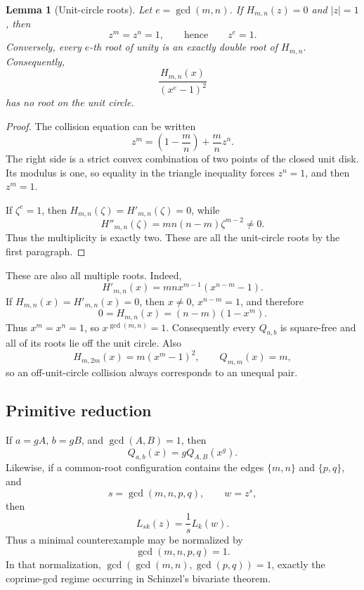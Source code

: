 \documentclass[11pt]{article}
\newtheorem{lemma}[theorem]{Lemma}
\theoremstyle{definition}
\begin{document}
\begin{lemma}[Unit-circle roots]\label{lem:unitcircle}
Let \(e=\gcd(m,n)\).  If \(H_{m,n}(z)=0\) and \(|z|=1\), then
\[
 z^m=z^n=1,
 \qquad\text{hence}\qquad z^e=1.
\]
Conversely, every \(e\)-th root of unity is an exactly double root of
\(H_{m,n}\).  Consequently,
\[
 \frac{H_{m,n}(x)}{(x^e-1)^2}
\]
has no root on the unit circle.
\end{lemma}

\begin{proof}
The collision equation can be written
\[
 z^m=\left(1-\frac mn\right)+\frac mn z^n.
\]
The right side is a strict convex combination of two points of the closed unit
disk.  Its modulus is one, so equality in the triangle inequality forces
\(z^n=1\), and then \(z^m=1\).

If \(\zeta^e=1\), then \(H_{m,n}(\zeta)=H'_{m,n}(\zeta)=0\), while
\[
 H''_{m,n}(\zeta)
 =mn(n-m)\zeta^{m-2}\neq0.
\]
Thus the multiplicity is exactly two.  These are all the unit-circle roots by
the first paragraph.
\end{proof}

These are also all multiple roots.  Indeed,
\[
 H'_{m,n}(x)=mnx^{m-1}(x^{n-m}-1).
\]
If \(H_{m,n}(x)=H'_{m,n}(x)=0\), then \(x\neq0\),
\(x^{n-m}=1\), and therefore
\[
 0=H_{m,n}(x)=(n-m)(1-x^m).
\]
Thus \(x^m=x^n=1\), so \(x^{\gcd(m,n)}=1\).  Consequently every
\(Q_{a,b}\) is square-free and all of its roots lie off the unit circle.
Also
\[
 H_{m,2m}(x)=m(x^m-1)^2,\qquad Q_{m,m}(x)=m,
\]
so an off-unit-circle collision always corresponds to an unequal pair.

\subsection{Primitive reduction}

If \(a=gA\), \(b=gB\), and \(\gcd(A,B)=1\), then
\begin{equation}
 Q_{a,b}(x)=gQ_{A,B}(x^g).
 \tag{2.5}
\end{equation}
Likewise, if a common-root configuration contains the edges \(\{m,n\}\) and
\(\{p,q\}\), and
\[
 s=\gcd(m,n,p,q),\qquad w=z^s,
\]
then
\begin{equation}
 L_{sk}(z)=\frac1sL_k(w).
 \tag{2.6}
\end{equation}
Thus a minimal counterexample may be normalized by
\[
 \gcd(m,n,p,q)=1.
 \tag{2.7}
\]
In that normalization,
\(\gcd(\gcd(m,n),\gcd(p,q))=1\), exactly the coprime-gcd regime occurring in
Schinzel's bivariate theorem.
\end{document}
